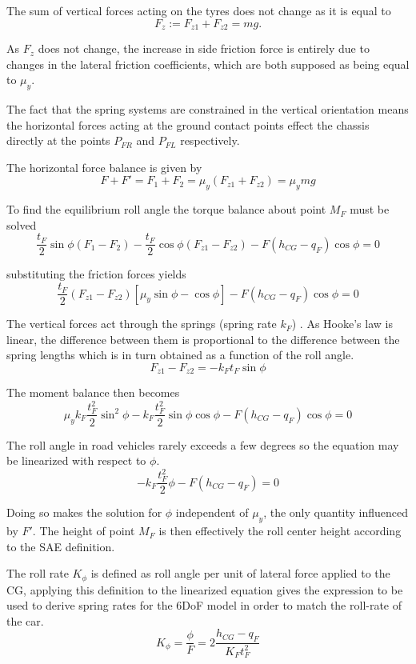 The sum of vertical forces acting on the tyres does not change as it is equal to
$$
F_z := F_{z1}+F_{z2} = mg.
$$

As $F_z$ does not change, the increase in side friction force is entirely due to changes in the lateral friction coefficients, which are both supposed as being equal to $\mu_y$.

The fact that the spring systems are constrained in the vertical orientation means the horizontal forces acting at the ground contact points effect the chassis directly at the points $P_{FR}$ and $P_{FL}$ respectively.

The horizontal force balance is given by
$$
F + F' = F_1 + F_2 = \mu_y ( F_{z1} + F_{z2} ) = \mu_y mg
$$

To find the equilibrium roll angle the torque balance about point $M_F$ must be solved
$$
\frac{t_F}{2} \sin \phi (F_1-F_2) - \frac{t_F}{2} \cos \phi ( F_{z1} - F_{z2} ) - F (h_{CG}-q_F)  \cos \phi = 0
$$

substituting the friction forces yields
$$
\frac{t_F}{2} ( F_{z1} - F_{z2} ) [\mu_y \sin \phi - \cos \phi ] - F (h_{CG}-q_F)  \cos \phi = 0
$$

The vertical forces act through the springs (spring rate $k_F$) . As Hooke's law is linear, the difference between them is proportional to the difference between the spring lengths which is in turn obtained as a function of the roll angle.
$$
F_{z1} - F_{z2} = - k_F t_F \sin \phi
$$

The moment balance then becomes
$$
\mu_y k_F \frac{t_F^2}{2} \sin^2 \phi - k_F \frac{t_F^2}{2} \sin \phi \cos \phi - F(h_{CG}-q_F) \cos \phi = 0
$$

The roll angle in road vehicles rarely exceeds a few degrees so the equation may be linearized with respect to $\phi$.
$$
- k_F \frac{t_F^2}{2}  \phi  - F(h_{CG}-q_F) = 0
$$

Doing so makes the solution for $\phi$ independent of $\mu_y$, the only quantity influenced by $F'$. The height of point $M_F$ is then effectively the roll center height according to the SAE definition.

The roll rate $K_\phi$ is defined as roll angle per unit of lateral force applied to the CG, applying this definition to the linearized equation gives the expression to be used to derive spring rates for the 6DoF model in order to match the roll-rate of the car.
$$
K_\phi = \frac{\phi}{F} = 2\frac{h_{CG}-q_F}{K_Ft_F^2}
$$
